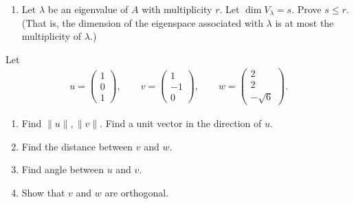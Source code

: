 \documentclass[12pt]{article}
\theoremstyle{remark}
\newtheorem*{solution}{Solution}
\renewcommand{\=}{&=&}
\newcommand{\<}{\langle}
\renewcommand{\>}{\rangle}
\newcommand{\bmat}{\begin{pmatrix}}
\newcommand{\emat}{\end{pmatrix}}
\newcommand{\beq}{\begin{eqnarray*}}
\newcommand{\eeq}{\end{eqnarray*}}
\begin{document}
\begin{problems}
\begin{enumerate}
	
	\item Let $\lambda$ be an eigenvalue of $A$ with multiplicity $r$. Let $\dim V_\lambda
	= s$. Prove $s \le r$. (That is, the dimension of the eigenspace associated with 
	$\lambda$ is at most the multiplicity of $\lambda$.)
	
\end{enumerate}



\item
Let
\beq
	u = \bmat 1 \\ 0 \\ 1 \emat, \qquad 
	v = \bmat 1 \\ -1 \\ 0 \emat, \qquad 
	w = \bmat 2 \\ 2 \\ -\sqrt{6} \emat.
\eeq
\begin{enumerate}
	\item Find $\|u\|,\|v\|$. Find a unit vector in the direction of $u$.
	
	
	\item Find the distance between $v$ and $w$.
	
	
	\item Find angle between $u$ and $v$.
	
	
	\item Show that $v$ and $w$ are orthogonal.
	

\end{enumerate}
\end{problems}
\end{document}
